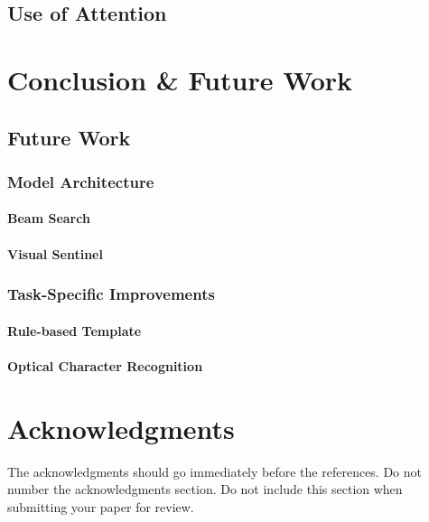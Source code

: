 \documentclass[11pt,a4paper]{article}
\begin{document}
\subsection{Use of Attention}
\label{ssec:useofattention}


\section{Conclusion \& Future Work}
\label{sec:conc&fw}
\subsection{Future Work}
\label{ssec:futurework}

\subsubsection{Model Architecture}
\label{sssec:modarch}
\paragraph{Beam Search}
\paragraph{Visual Sentinel}

\subsubsection{Task-Specific Improvements}
\label{sssec:ds task}
\paragraph{Rule-based Template}
\paragraph{Optical Character Recognition}



\section*{Acknowledgments}

The acknowledgments should go immediately before the references. Do not number the acknowledgments section.
Do not include this section when submitting your paper for review.



\end{document}

